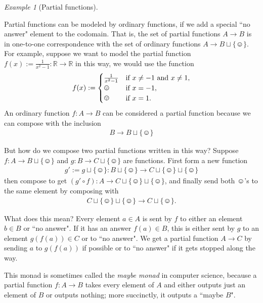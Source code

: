 \documentclass{book}
\def\tn{\textnormal}
\def\RR{{\mathbb R}}
\def\singleton{\{\smiley\}}
\def\to{\rightarrow}
\def\taking{\colon}
\theoremstyle{remark}
\newtheorem{example}[subsubsection]{Example}
\theoremstyle{definition}
\begin{document}
\begin{example}[Partial functions]\label{ex:partial function monad}

Partial functions can be modeled by ordinary functions, if we add a special ``no answer" element to the codomain. That is, the set of partial functions $A\to B$ is in one-to-one correspondence with the set of ordinary functions $A\to B\sqcup\singleton$. For example, suppose we want to model the partial function $f(x):=\frac{1}{x^2-1}\taking\RR\to\RR$ in this way, we would use the function 
$$f(x):=\begin{cases}
\frac{1}{x^2-1}&\tn{if } x\neq -1 \tn{ and } x\neq 1,\\
\smiley&\tn{if } x=-1,\\
\smiley&\tn{if } x= 1.
\end{cases}
$$
An ordinary function $f\taking A\to B$ can be considered a partial function because we can compose with the inclusion 
\begin{align}\label{dia:first eta}
B\to B\sqcup\singleton
\end{align}

But how do we compose two partial functions written in this way? Suppose $f\taking A\to B\sqcup\singleton$ and $g\taking B\to C\sqcup\singleton$ are functions. First form a new function 
\begin{align}\label{dia:first monad}
g':=g\sqcup\singleton\taking B\sqcup\singleton\to C\sqcup\singleton\sqcup\singleton
\end{align}
then compose to get $(g'\circ f)\taking A\to C\sqcup\singleton\sqcup\singleton$, and finally send both $\smiley$'s to the same element by composing with 
\begin{align}\label{dia:first mu}
C\sqcup\singleton\sqcup\singleton\to C\sqcup\singleton.
\end{align}

What does this mean? Every element $a\in A$ is sent by $f$ to either an element $b\in B$ or ``no answer". If it has an answer $f(a)\in B$, this is either sent by $g$ to an element $g(f(a))\in C$ or to ``no answer". We get a partial function $A\to C$ by sending $a$ to $g(f(a))$ if possible or to ``no answer" if it gets stopped along the way.

This monad is sometimes called the {\em maybe monad} in computer science, because a partial function $f\taking A\to B$ takes every element of $A$ and either outputs just an element of $B$ or outputs nothing; more succinctly, it outputs a ``maybe $B$".

\end{example}
\end{document}
